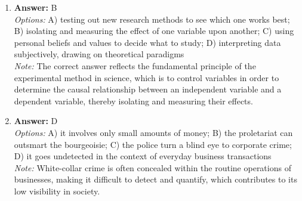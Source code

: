 \documentclass[12pt]{article}
\begin{document}
\begin{enumerate}[label=\arabic*.]
\item \textbf{Answer:} B
\\ \textit{Options:} A) testing out new research methods to see which one works best; B) isolating and measuring the effect of one variable upon another; C) using personal beliefs and values to decide what to study; D) interpreting data subjectively, drawing on theoretical paradigms
\\ \textit{Note:} The correct answer reflects the fundamental principle of the experimental method in science, which is to control variables in order to determine the causal relationship between an independent variable and a dependent variable, thereby isolating and measuring their effects.
\item \textbf{Answer:} D
\\ \textit{Options:} A) it involves only small amounts of money; B) the proletariat can outsmart the bourgeoisie; C) the police turn a blind eye to corporate crime; D) it goes undetected in the context of everyday business transactions
\\ \textit{Note:} White-collar crime is often concealed within the routine operations of businesses, making it difficult to detect and quantify, which contributes to its low visibility in society.
\end{enumerate}
\end{document}

